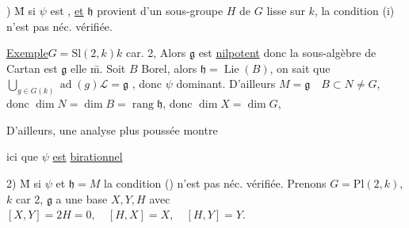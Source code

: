 
\uline{}) \={M} si $\psi$ est , \uline{et} $\mathfrak h$ provient
d'un sous-groupe $H$ de $G$ lisse sur $k$, 
la condition (i) n'est pas néc. vérifiée.

\uline{Exemple}\quad $G=\mathrm{Sl}(2,k)$\quad $k$ car. 2, Alors
$\mathfrak g$ est \uline{nilpotent} donc la  sous-algèbre de
Cartan  est $\mathfrak g$ elle \={m}. Soit
$B$ Borel, alors  $\mathfrak h=\operatorname{Lie}(B)$, on sait
que $\bigcup_{g\in G(k)}\operatorname{ad}(g)\mathscr L=\mathfrak g$  , 
 donc $\psi$ dominant. D'ailleurs
$M=\mathfrak g\quad B\subset N\ne G$, donc $\dim N=\dim B=\operatorname{rang}\mathfrak h$,
donc $\dim X=\dim G$,  


D'ailleurs, une analyse plus poussée montre


ici que $\psi$ \uline{est}
 \uline{birationnel}

\reversemarginpar
{}
\normalmarginpar

2) \={M} si $\psi$  et $\mathfrak h=M$
la condition () n'est pas
néc. vérifiée. Prenons
$G=\mathrm{Pl}(2,k)$, $k$ car 2, $\mathfrak g$ a une
base $X,Y,H$ avec
$[X,Y]=2H=0,\quad[H,X]=X,\quad[H,Y]=Y$.

